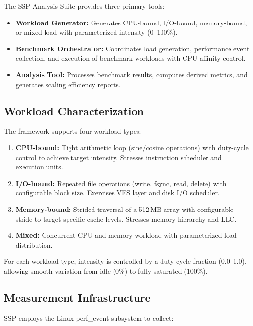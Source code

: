 \documentclass[conference]{IEEEtran}
\begin{document}
The SSP Analysis Suite provides three primary tools:

\begin{itemize}
  \item \textbf{Workload Generator:} Generates CPU-bound, I/O-bound, memory-bound,
        or mixed load with parameterized intensity (0--100\%).
  \item \textbf{Benchmark Orchestrator:} Coordinates load generation, performance
        event collection, and execution of benchmark workloads with CPU affinity control.
  \item \textbf{Analysis Tool:} Processes benchmark results, computes derived
        metrics, and generates scaling efficiency reports.
\end{itemize}

\subsection{Workload Characterization}

The framework supports four workload types:

\begin{enumerate}
  \item \textbf{CPU-bound:} Tight arithmetic loop (sine/cosine operations)
        with duty-cycle control to achieve target intensity. Stresses
        instruction scheduler and execution units.
  \item \textbf{I/O-bound:} Repeated file operations (write, fsync, read,
        delete) with configurable block size. Exercises VFS layer and disk
        I/O scheduler.
  \item \textbf{Memory-bound:} Strided traversal of a 512\,MB array with
        configurable stride to target specific cache levels. Stresses memory
        hierarchy and LLC.
  \item \textbf{Mixed:} Concurrent CPU and memory workload with
        parameterized load distribution.
\end{enumerate}

For each workload type, intensity is controlled by a duty-cycle fraction
(0.0--1.0), allowing smooth variation from idle (0\%) to fully saturated
(100\%).

\subsection{Measurement Infrastructure}

SSP employs the Linux perf\_event subsystem to collect:
\end{document}
